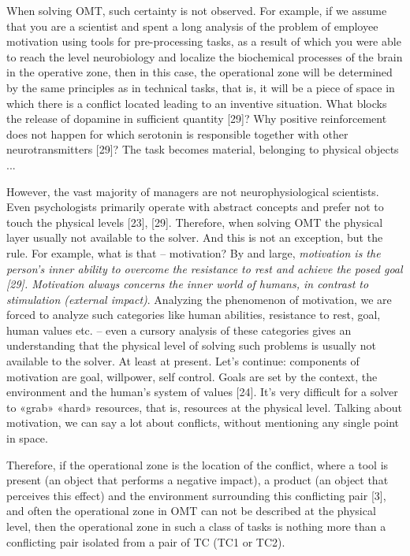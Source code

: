\documentclass[11pt,a4paper]{book}
\begin{document}
When solving OMT, such certainty is not observed. For example, if we assume
that you are a scientist and spent a long analysis of the problem of employee
motivation using tools for pre-processing tasks, as a result of which you were
able to reach the level neurobiology and localize the biochemical processes of
the brain in the operative zone, then in this case, the operational zone will
be determined by the same principles as in technical tasks, that is, it will
be a piece of space in which there is a conflict located leading to an
inventive situation. What blocks the release of dopamine in sufficient
quantity [29]? Why positive reinforcement does not happen for which serotonin
is responsible together with other neurotransmitters [29]? The task becomes
material, belonging to physical objects ...

However, the vast majority of managers are not neurophysiological scientists.
Even psychologists primarily operate with abstract concepts and prefer not to
touch the physical levels [23], [29]. Therefore, when solving OMT the physical
layer usually not available to the solver. And this is not an exception, but
the rule. For example, what is that -- motivation? By and large,
\emph{motivation is the person’s inner ability to overcome the resistance to
  rest and achieve the posed goal [29]. Motivation always concerns the inner
  world of humans, in contrast to stimulation (external impact)}. Analyzing
the phenomenon of motivation, we are forced to analyze such categories like
human abilities, resistance to rest, goal, human values etc. -- even a cursory
analysis of these categories gives an understanding that the physical level of
solving such problems is usually not available to the solver. At least at
present.  Let's continue: components of motivation are goal, willpower, self
control. Goals are set by the context, the environment and the human's system
of values [24]. It’s very difficult for a solver to «grab» «hard» resources,
that is, resources at the physical level. Talking about motivation, we can say
a lot about conflicts, without mentioning any single point in space.

Therefore, if the operational zone is the location of the conflict, where a
tool is present (an object that performs a negative impact), a product (an
object that perceives this effect) and the environment surrounding this
conflicting pair [3], and often the operational zone in OMT can not be
described at the physical level, then the operational zone in such a class of
tasks is nothing more than a conflicting pair isolated from a pair of TC (TC1
or TC2).
\end{document}
